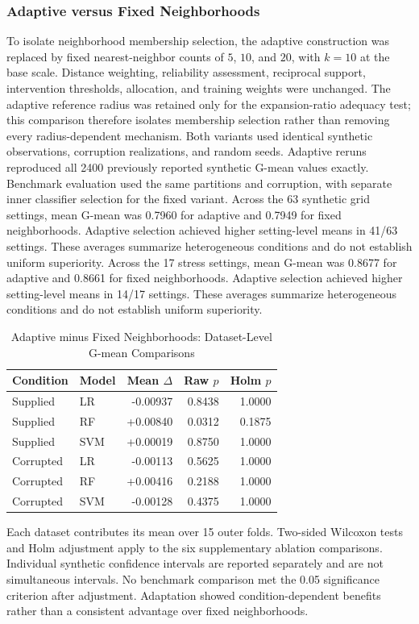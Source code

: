 \subsubsection{Adaptive versus Fixed Neighborhoods}
\label{subsec:adaptive_fixed_ablation}
To isolate neighborhood membership selection, the adaptive construction was replaced by fixed nearest-neighbor counts of $5$, $10$, and $20$, with $k=10$ at the base scale. Distance weighting, reliability assessment, reciprocal support, intervention thresholds, allocation, and training weights were unchanged. The adaptive reference radius was retained only for the expansion-ratio adequacy test; this comparison therefore isolates membership selection rather than removing every radius-dependent mechanism.
Both variants used identical synthetic observations, corruption realizations, and random seeds. Adaptive reruns reproduced all 2400 previously reported synthetic G-mean values exactly. Benchmark evaluation used the same partitions and corruption, with separate inner classifier selection for the fixed variant.
Across the 63 synthetic grid settings, mean G-mean was 0.7960 for adaptive and 0.7949 for fixed neighborhoods. Adaptive selection achieved higher setting-level means in 41/63 settings. These averages summarize heterogeneous conditions and do not establish uniform superiority.
Across the 17 stress settings, mean G-mean was 0.8677 for adaptive and 0.8661 for fixed neighborhoods. Adaptive selection achieved higher setting-level means in 14/17 settings. These averages summarize heterogeneous conditions and do not establish uniform superiority.
\begin{table}[t]
\caption{Adaptive minus Fixed Neighborhoods: Dataset-Level G-mean Comparisons}
\label{tab:adaptive_fixed_benchmark}
\centering
\begin{tabular}{llrrr}
\hline
Condition & Model & Mean $\Delta$ & Raw $p$ & Holm $p$\\
\hline
Supplied & LR & -0.00937 & 0.8438 & 1.0000 \\
Supplied & RF & +0.00840 & 0.0312 & 0.1875 \\
Supplied & SVM & +0.00019 & 0.8750 & 1.0000 \\
Corrupted & LR & -0.00113 & 0.5625 & 1.0000 \\
Corrupted & RF & +0.00416 & 0.2188 & 1.0000 \\
Corrupted & SVM & -0.00128 & 0.4375 & 1.0000 \\
\hline
\end{tabular}
\end{table}
Each dataset contributes its mean over 15 outer folds. Two-sided Wilcoxon tests and Holm adjustment apply to the six supplementary ablation comparisons. Individual synthetic confidence intervals are reported separately and are not simultaneous intervals.
No benchmark comparison met the 0.05 significance criterion after adjustment. Adaptation showed condition-dependent benefits rather than a consistent advantage over fixed neighborhoods.
